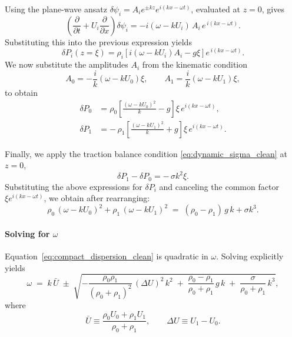 \par\vspace{6pt}
Using the plane-wave ansatz $\delta\psi_i = A_i e^{\pm k z} e^{i(kx-\omega t)}$, evaluated at $z=0$, gives
\[
\left(\frac{\partial}{\partial t} + U_i\frac{\partial}{\partial x}\right)\delta\psi_i
= -i(\omega - kU_i)\,A_i\,e^{\,i(kx-\omega t)}.
\]
Substituting this into the previous expression yields
\begin{equation}
\delta P_i(z=\xi) = 
\rho_i\left[i(\omega - kU_i)A_i - g\xi\right] e^{\,i(kx-\omega t)}.
\end{equation}
We now substitute the amplitudes $A_i$ from the kinematic condition
\[
A_0 = -\frac{i}{k}(\omega - kU_0)\xi,
\qquad
A_1 = \frac{i}{k}(\omega - kU_1)\xi,
\]
to obtain
\begin{align}
\delta P_0 &= \rho_0
\left[\frac{(\omega - kU_0)^2}{k} - g\right]\xi\,e^{i(kx-\omega t)},\\
\delta P_1 &= -\,\rho_1
\left[\frac{(\omega - kU_1)^2}{k} + g\right]\xi\,e^{i(kx-\omega t)}.
\end{align}

\par\vspace{6pt}
Finally, we apply the traction balance condition \eqref{eq:dynamic_sigma_clean} at $z=0$,
\[
\delta P_1 - \delta P_0 = -\,\sigma k^2\xi.
\]
Substituting the above expressions for $\delta P_i$ and canceling the common factor $\xi e^{i(kx-\omega t)}$, 
we obtain after rearranging:
\begin{equation}
\label{eq:compact_dispersion_clean}
\rho_0\,(\omega - k U_0)^2 + \rho_1\,(\omega - k U_1)^2
\;=\;
(\rho_0 - \rho_1)\,g\,k + \sigma k^3.
\end{equation}


\paragraph{Solving for $\omega$}
Equation~\eqref{eq:compact_dispersion_clean} is quadratic in $\omega$. Solving explicitly yields
\begin{equation}
\label{eq:omega_solution_clean}
\boxed{
\omega
\;=\;
k\,\bar{U}
\;\pm\;
\sqrt{
-\frac{\rho_0\rho_1}{(\rho_0+\rho_1)^2}\,(\Delta U)^2\,k^2
\;+\;
\frac{\rho_0 - \rho_1}{\rho_0+\rho_1}\,g\,k
\;+\;
\frac{\sigma}{\rho_0+\rho_1}\,k^3
},
}
\end{equation}
where
\[
\bar{U} \equiv \frac{\rho_0 U_0 + \rho_1 U_1}{\rho_0+\rho_1},
\qquad
\Delta U \equiv U_1 - U_0.
\]

